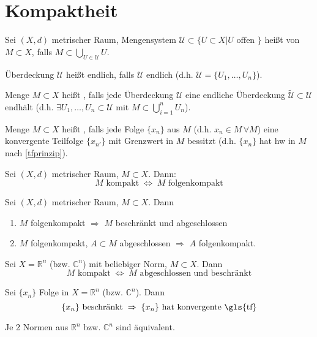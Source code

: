 \section{Kompaktheit}
\begin{*definition}
Sei $(X,d)$ metrischer Raum, Mengensystem $\mathcal{U}\subset \{ U\subset X | U \text{ offen }\}$ heißt  von $M\subset X$, falls $M\subset \bigcup_{U\in\mathcal{U}} U$.

Überdeckung $\mathcal{U}$ heißt endlich, falls $\mathcal{U}$ endlich (d.h. $\mathcal{U} = \{U_1,\dotsc,U_n\}$).

Menge $M\subset X$ heißt , falls jede Überdeckung $\mathcal{U}$ eine endliche Überdeckung $\tilde{\mathcal{U}}\subset \mathcal{U}$ endhält (d.h. $\exists U_1,\dotsc, U_n\subset\mathcal{U}$ mit $M\subset\bigcup_{i=1}^n U_n$).

Menge $M\subset X$ heißt , falls jede Folge $\{x_n\}$ aus $M$ (d.h. $x_n\in M\,\forall M$) eine konvergente Teilfolge $\{x_{n'}\}$ mit Grenzwert in $M$ bessitzt (d.h. $\{x_n\}$ hat \gls{hw} in $M$ nach \ref{tfprinzip}).
\end{*definition}

\begin{theorem}
	Sei $(X,d)$ metrischer Raum, $M\subset X$. Dann:\[M\text{ kompakt} \;\Leftrightarrow\; M\text{ folgenkompakt}\]
\end{theorem}

\begin{proposition}
	Sei $(X,d)$ metrischer Raum, $M\subset X$. Dann
	\begin{enumerate}[label={\arabic*)}]
		\item $M$ folgenkompakt $\Rightarrow$ $M$ beschränkt und abgeschlossen
		\item $M$ folgenkompakt, $A\subset M$ abgeschlossen $\Rightarrow$ $A$ folgenkompakt.
	\end{enumerate}
\end{proposition}
\begin{theorem}
	Sei $X=\mathbb{R}^n$ (bzw. $\mathbb{C}^n$) mit beliebiger Norm, $M\subset X$. Dann \[ M \text{ kompakt} \;\Leftrightarrow\; M \text{ abgeschlossen und beschränkt} \]
\end{theorem}
\begin{conclusion}
	Sei $\{x_n\}$ Folge in $X=\mathbb{R}^n$ (bzw. $\mathbb{C}^n$). Dann \[ \{x_n\}\text{ beschränkt} \;\Rightarrow \; \{x_n\} \text{ hat konvergente \gls{tf}}\]
\end{conclusion}
\begin{proposition}
	Je 2 Normen aus $\mathbb{R}^n$ bzw. $\mathbb{C}^n$ sind äquivalent.
\end{proposition}